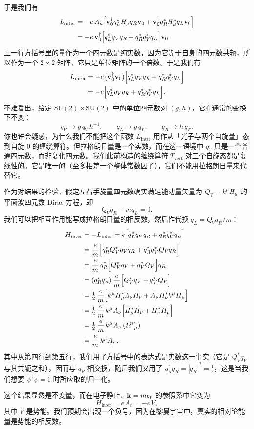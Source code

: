 于是我们有
\begin{align*}
L_{\mathrm{inter}}
&= -e\,A_\mu\Bigl[\mathbf{v}_0^\dagger q_L^* H_\mu q_R \mathbf{v}_0+\mathbf{v}_0^\dagger q_R^* H_\mu^* q_L \mathbf{v}_0\Bigr]\\
&= -e\,\mathbf{v}_0^\dagger\Bigl[q_L^* q_V q_R+q_R^* q_V^* q_L\Bigr]\mathbf{v}_0 .
\end{align*}
上一行方括号里的量作为一个四元数是纯实数，因为它等于自身的四元数共轭，所以作为一个 $2\times2$ 矩阵，它只是单位矩阵的一个倍数。于是我们有
\begin{align*}
L_{\mathrm{inter}}
&= -e\,(\mathbf{v}_0^\dagger \mathbf{v}_0)\Bigl[q_L^* q_V q_R+q_R^* q_V^* q_L\Bigr]\\
&= -e\Bigl[q_L^* q_V q_R+q_R^* q_V^* q_L\Bigr].
\end{align*}
不难看出，给定 $\mathrm{SU}(2)\times\mathrm{SU}(2)$ 中的单位四元数对 $(g,h)$，它在通常的变换下不变：
\begin{equation*}
q_V\to g\,q_V\,h^{-1},\qquad q_L\to g\,q_L,\qquad q_R\to h\,q_R .
\end{equation*}
你也许会疑惑，为什么我们不能把这个函数 $L_{\mathrm{inter}}$ 用作从「光子与两个自旋量」态到自旋 0 的缠绕算符。但拉格朗日量是一个实数，而在这一语境中 $q_V$ 只是一个普通四元数，而非复化四元数。我们此前构造的缠绕算符 $T_{\mathrm{vert}}$ 对三个自旋态都是复线性的。它是唯一的（至多相差一个整体常数因子），我们不能用拉格朗日量来代替它。

作为对结果的检验，假定左右手旋量四元数确实满足能动量矢量为 $Q_V=k^\mu H_\mu$ 的平面波四元数 Dirac 方程，即
\begin{equation*}
Q_V q_R-m q_L=0 .
\end{equation*}
我们可以把相互作用能写成拉格朗日量的相反数，然后作代换 $q_L=Q_V q_R/m$：
\begin{align*}
H_{\mathrm{inter}}
&= -L_{\mathrm{inter}}
= e\Bigl[q_L^* q_V q_R+q_R^* q_V^* q_L\Bigr]\\
&= \frac{e}{m}\Bigl[q_R^* Q_V^* q_V q_R+q_R^* q_V^* Q_V q_R\Bigr]\\
&= \frac{e}{m}\,q_R^*\Bigl[Q_V^* q_V+q_V^* Q_V\Bigr]q_R\\
&= (q_R^* q_R)\,\frac{e}{m}\Bigl[Q_V^* q_V+q_V^* Q_V\Bigr]\\
&= \tfrac12\,\frac{e}{m}\Bigl[k^\mu H_\mu^* A_\nu H_\nu+A_\nu H_\nu^* k^\mu H_\mu\Bigr]\\
&= \tfrac12\,\frac{e}{m}\,k^\mu A_\nu\Bigl[H_\mu^* H_\nu+H_\nu^* H_\mu\Bigr]\\
&= \tfrac12\,\frac{e}{m}\,k^\mu A_\nu\,(2\delta^{\nu}_{\ \mu})\\
&= \frac{e}{m}\,k^\mu A_\mu,
\end{align*}
其中从第四行到第五行，我们用了方括号中的表达式是实数这一事实（它是 $Q_V^* q_V$ 与其共轭之和），因而与 $q_R$ 相交换，随后我们又用了 $q_R^* q_R=|q_R|^{2}=\tfrac12$，这是当我们想要 $\psi^\dagger\psi=1$ 时所应取的归一化。

这个结果显然是不变量，而在电子静止、$\mathbf{k}=m\mathbf{e}_t$ 的参照系中它变为
\begin{equation*}
H_{\mathrm{inter}}=e\,A_t=-e\,V,
\end{equation*}
其中 $V$ 是势能。我们预期会出现一个负号，因为在黎曼宇宙中，真实的相对论能量是势能的相反数。
